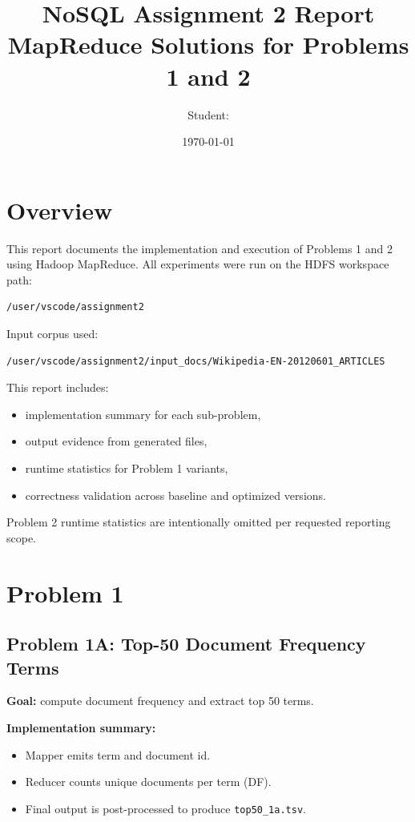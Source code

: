 \documentclass[11pt]{article}
\title{NoSQL Assignment 2 Report\\MapReduce Solutions for Problems 1 and 2}
\author{Student: \underline{\hspace{5cm}}}
\date{\today}
\begin{document}
\maketitle

\section{Overview}
This report documents the implementation and execution of Problems 1 and 2 using Hadoop MapReduce.
All experiments were run on the HDFS workspace path:
\begin{lstlisting}
/user/vscode/assignment2
\end{lstlisting}

Input corpus used:
\begin{lstlisting}
/user/vscode/assignment2/input_docs/Wikipedia-EN-20120601_ARTICLES
\end{lstlisting}

This report includes:
\begin{itemize}[leftmargin=*]
  \item implementation summary for each sub-problem,
  \item output evidence from generated files,
  \item runtime statistics for Problem 1 variants,
  \item correctness validation across baseline and optimized versions.
\end{itemize}

Problem 2 runtime statistics are intentionally omitted per requested reporting scope.

\section{Problem 1}

\subsection{Problem 1A: Top-50 Document Frequency Terms}
\textbf{Goal:} compute document frequency and extract top 50 terms.

\textbf{Implementation summary:}
\begin{itemize}[leftmargin=*]
  \item Mapper emits term and document id.
  \item Reducer counts unique documents per term (DF).
  \item Final output is post-processed to produce \texttt{top50\_1a.tsv}.
\end{itemize}
\end{document}
